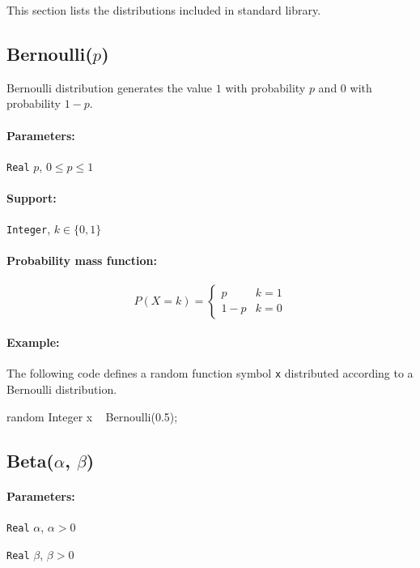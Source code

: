 This section lists the distributions included in \bl standard library.

\subsection{Bernoulli($p$)}
Bernoulli distribution generates the value $1$ with probability $p$ and $0$ with probability $1-p$. 

\paragraph*{Parameters:} 
\begin{itemize*}
\item[] \verb|Real|
 $p$, $0 \leq p \leq 1$ 
\end{itemize*}
\paragraph*{Support:} \verb|Integer|, $k \in \{0, 1\}$ 

\paragraph*{Probability mass function:}
\[
	P(X = k) = \left\{
	  \begin{array}{lr}
	    p &    k = 1 \\
	    1-p &  k = 0
	  \end{array}
	\right.
\]

\paragraph*{Example:}
The following code defines a random function symbol \verb|x| distributed according to a Bernoulli distribution.
\begin{blogcode}
random Integer x ~ Bernoulli(0.5);
\end{blogcode}

\subsection{Beta($\alpha$, $\beta$)}

\paragraph*{Parameters:} 
\begin{itemize*}
\item[] \verb|Real| $\alpha$, $\alpha > 0$ 
\item[] \verb|Real| $\beta$, $\beta > 0$ 
\end{itemize*}

